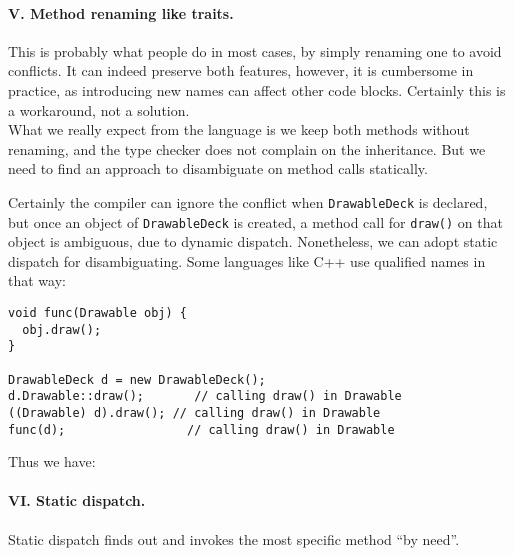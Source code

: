 \paragraph{V. Method renaming like traits.} This is probably what people do in most cases, by simply renaming one to avoid conflicts.
It can indeed preserve both features, however, it is cumbersome in practice, as introducing new names can affect other code blocks.
Certainly this is a workaround, not a solution.\\

What we really expect from the language is we keep both methods without renaming, and the type checker does not complain on the
inheritance. But we need to find an approach to disambiguate on method calls statically.

Certainly the compiler can ignore the conflict when \lstinline|DrawableDeck| is declared, but once an object of \lstinline|DrawableDeck| is created, a method call for \lstinline|draw()| on that object is ambiguous, due to dynamic dispatch. Nonetheless, we can adopt static dispatch for disambiguating. Some languages like C++ use qualified names in that way:

\vspace{3pt}\begin{lstlisting}
void func(Drawable obj) {
  obj.draw();
}

DrawableDeck d = new DrawableDeck();
d.Drawable::draw();       // calling draw() in Drawable
((Drawable) d).draw(); // calling draw() in Drawable
func(d);                 // calling draw() in Drawable
\end{lstlisting}\vspace{3pt}
Thus we have: \paragraph{VI. Static dispatch.} Static dispatch finds out and invokes the most specific method ``by need''.

